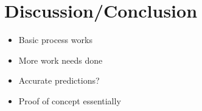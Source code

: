 \section{Discussion/Conclusion}
\begin{itemize}
    \item Basic process works
    \item More work needs done
    \item Accurate predictions?
    \item Proof of concept essentially
\end{itemize}



%
%

